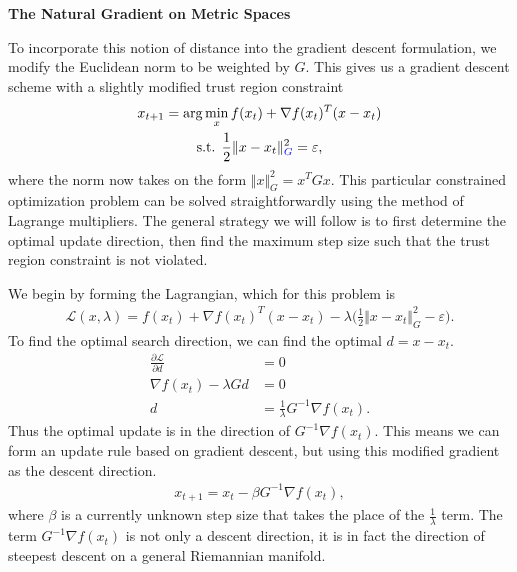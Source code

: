 \documentclass[twoside,10pt]{article}
\newcommand{\subheader}[1]{\bigskip\begin{center}\textbf{#1}\end{center}}
\begin{document}
\subheader{The Natural Gradient on Metric Spaces}

To incorporate this notion of distance into the gradient descent formulation, we modify the Euclidean norm to be weighted by $G$. This gives us a gradient descent scheme with a slightly modified trust region constraint
\begin{gather*}
    x_{t+1} = \arg\min_x f(x_t) + \nabla f(x_t)^T (x-x_t) \\
    \text{s.t. } \frac{1}{2} \Vert x - x_t \Vert^2_{\color{blue}G} = \varepsilon,
\end{gather*}
where the norm now takes on the form $\Vert x \Vert^2_G = x^T G x$. This particular constrained optimization problem can be solved straightforwardly using the method of Lagrange multipliers. The general strategy we will follow is to first determine the optimal update direction, then find the maximum step size such that the trust region constraint is not violated.

We begin by forming the Lagrangian, which for this problem is
\begin{gather*}
    \mathcal{L}(x, \lambda) = f(x_t) + \nabla f(x_t)^T (x-x_t) - \lambda \Big( \frac{1}{2} \Vert x - x_t \Vert_G^2 - \varepsilon \Big).
\end{gather*}
To find the optimal search direction, we can find the optimal $d = x - x_t$.
\begin{align*}
    \frac{\partial \mathcal{L}}{\partial d} &= 0 \\
	\nabla f(x_t) - \lambda G d &= 0 \\
	d &= \frac{1}{\lambda} G^{-1} \nabla f(x_t).
\end{align*}
Thus the optimal update is in the direction of $G^{-1} \nabla f(x_t)$. This means we can form an update rule based on gradient descent, but using this modified gradient as the descent direction.
\begin{gather*}
    x_{t+1} = x_t - \beta G^{-1} \nabla f(x_t),
\end{gather*}
where $\beta$ is a currently unknown step size that takes the place of the $\frac{1}{\lambda}$ term. The term $G^{-1} \nabla f(x_t)$ is not only a descent direction, it is in fact the direction of steepest descent on a general Riemannian manifold.\cite{amari}
\end{document}

